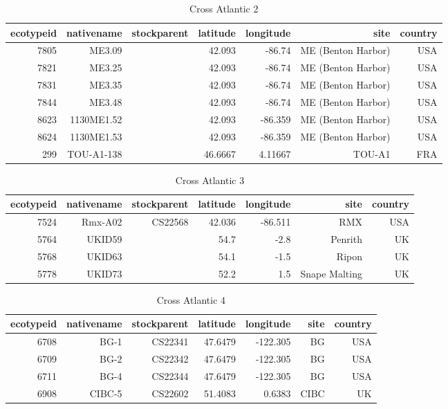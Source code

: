 \documentclass[a4paper,10pt]{article}
\begin{document}
\begin{table}
\caption{Cross Atlantic 2}
\begin{tabular}{|r|r|r|r|r|r|r|}
\hline
ecotypeid & nativename & stockparent & latitude & longitude & site & country\\
\hline
7805 & ME3.09     &             &   42.093 &    -86.74 & ME (Benton Harbor) & USA \\
7821 & ME3.25     &             &   42.093 &    -86.74 & ME (Benton Harbor) & USA \\
7831 & ME3.35     &             &   42.093 &    -86.74 & ME (Benton Harbor) & USA \\
7844 & ME3.48     &             &   42.093 &    -86.74 & ME (Benton Harbor) & USA \\
8623 & 1130ME1.52 &             &   42.093 &   -86.359 & ME (Benton Harbor) & USA \\
8624 & 1130ME1.53 &             &   42.093 &   -86.359 & ME (Benton Harbor) & USA \\
 299 & TOU-A1-138 &             &  46.6667 &   4.11667 & TOU-A1             & FRA \\
\hline
\end{tabular}
\label{thap_3}
\end{table}

\begin{table}
\caption{Cross Atlantic 3}
\begin{tabular}{|r|r|r|r|r|r|r|}
\hline
ecotypeid & nativename & stockparent & latitude & longitude & site & country\\
\hline
7524 & Rmx-A02    & CS22568     &   42.036 &   -86.511 & RMX           & USA \\
5764 & UKID59     &             &     54.7 &      -2.8 & Penrith       & UK  \\
5768 & UKID63     &             &     54.1 &      -1.5 & Ripon         & UK  \\
5778 & UKID73     &             &     52.2 &       1.5 & Snape Malting & UK  \\
\hline
\end{tabular}
\label{thap_4}
\end{table}

\begin{table}
\caption{Cross Atlantic 4}
\begin{tabular}{|r|r|r|r|r|r|r|}
\hline
ecotypeid & nativename & stockparent & latitude & longitude & site & country\\
\hline
6708 & BG-1       & CS22341     &  47.6479 &  -122.305 & BG   & USA \\
6709 & BG-2       & CS22342     &  47.6479 &  -122.305 & BG   & USA \\
6711 & BG-4       & CS22344     &  47.6479 &  -122.305 & BG   & USA \\
6908 & CIBC-5     & CS22602     &  51.4083 &    0.6383 & CIBC & UK  \\
\hline
\end{tabular}
\label{thap_5}
\end{table}
\end{document}
